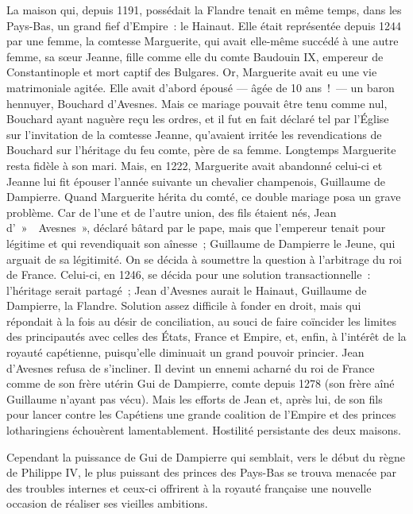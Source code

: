 \documentclass[french,twoside]{book} %
\begin{document}
\label{p24} La maison qui, depuis 1191, possédait la Flandre tenait en même temps, dans les Pays-Bas, un grand fief d’Empire : le Hainaut. Elle était représentée depuis 1244 par une femme, la comtesse Marguerite, qui avait elle-même succédé à une autre femme, sa sœur Jeanne, fille comme elle du comte Baudouin IX, empereur de Constantinople et mort captif des Bulgares. Or, Marguerite avait eu une vie matrimoniale agitée. Elle avait d’abord épousé — âgée de 10 ans ! — un baron hennuyer, Bouchard d’Avesnes. Mais ce mariage pouvait être tenu comme nul, Bouchard ayant naguère reçu les ordres, et il fut en fait déclaré tel par l’Église sur l’invitation de la comtesse Jeanne, qu’avaient irritée les revendications de Bouchard sur l’héritage du feu comte, père de sa femme. Longtemps Marguerite resta fidèle à son mari. Mais, en 1222, Marguerite avait abandonné celui-ci et Jeanne lui fit épouser l’année suivante un chevalier champenois, Guillaume de Dampierre. Quand Marguerite hérita du comté, ce double mariage posa un grave problème. Car de l’une et de l’autre union, des fils étaient nés, Jean d’ »  Avesnes », déclaré bâtard par le pape, mais que l’empereur tenait pour légitime et qui revendiquait son aînesse ; Guillaume de Dampierre le Jeune, qui arguait de sa légitimité. On se décida à soumettre la question à l’arbitrage du roi de France. Celui-ci, en 1246, se décida pour une solution transactionnelle : l’héritage serait partagé ; Jean d’Avesnes aurait le Hainaut, Guillaume de Dampierre, la Flandre. Solution assez difficile à fonder en droit, mais qui répondait à la fois au désir de conciliation, au souci de faire coïncider les limites des principautés avec celles des États, France et Empire, et, enfin, à l’intérêt de la royauté capétienne, puisqu’elle diminuait un grand pouvoir princier. Jean d’Avesnes refusa de s’incliner. Il devint un ennemi acharné du roi de France comme de son frère utérin Gui de Dampierre, comte depuis 1278 (son frère aîné Guillaume n’ayant pas vécu). Mais les efforts de Jean et, après lui, de son fils pour lancer contre les Capétiens une grande coalition de l’Empire et des princes lotharingiens échouèrent lamentablement. Hostilité persistante des deux maisons.\par
Cependant la puissance de Gui de Dampierre qui semblait, vers le début du règne de Philippe IV, le plus puissant des princes des Pays-Bas se trouva menacée par des troubles internes et ceux-ci offrirent à la royauté française une nouvelle occasion de réaliser ses vieilles ambitions.\par
\end{document}
